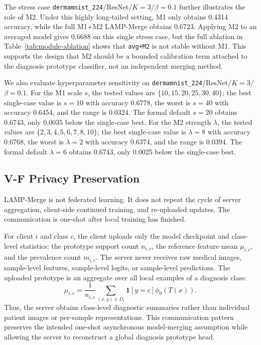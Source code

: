 The stress case \texttt{dermamnist\_224}/ResNet/$K=3$/$\beta=0.1$ further illustrates the role of M2. Under this highly long-tailed setting, M1 only obtains 0.4314 accuracy, while the full M1+M2 LAMP-Merge obtains 0.6723. Applying M2 to an averaged model gives 0.6688 on this single stress case, but the full ablation in Table~\ref{tab:module-ablation} shows that \texttt{avg+M2} is not stable without M1. This supports the design that M2 should be a bounded calibration term attached to the diagnosis prototype classifier, not an independent merging method.

We also evaluate hyperparameter sensitivity on \texttt{dermamnist\_224}/ResNet/$K=3$/$\beta=0.1$. For the M1 scale $s$, the tested values are $\{10,15,20,25,30,40\}$; the best single-case value is $s=10$ with accuracy 0.6778, the worst is $s=40$ with accuracy 0.6454, and the range is 0.0324. The formal default $s=20$ obtains 0.6743, only 0.0035 below the single-case best. For the M2 strength $\lambda$, the tested values are $\{2,3,4,5,6,7,8,10\}$; the best single-case value is $\lambda=8$ with accuracy 0.6768, the worst is $\lambda=2$ with accuracy 0.6374, and the range is 0.0394. The formal default $\lambda=6$ obtains 0.6743, only 0.0025 below the single-case best.

\subsection{V-F Privacy Preservation}
LAMP-Merge is not federated learning. It does not repeat the cycle of server aggregation, client-side continued training, and re-uploaded updates. The communication is one-shot after local training has finished.

For client $i$ and class $c$, the client uploads only the model checkpoint and class-level statistics: the prototype support count $n_{i,c}$, the reference feature mean $\mu_{i,c}$, and the prevalence count $m_{i,c}$. The server never receives raw medical images, sample-level features, sample-level logits, or sample-level predictions. The uploaded prototype is an aggregate over all local examples of a diagnosis class:
\[
\mu_{i,c}=\frac{1}{n_{i,c}}\sum_{(x,y)\in D_i}\mathbf{1}[y=c]\phi_0(T(x)).
\]
Thus, the server obtains class-level diagnostic summaries rather than individual patient images or per-sample representations. This communication pattern preserves the intended one-shot asynchronous model-merging assumption while allowing the server to reconstruct a global diagnosis prototype head.

